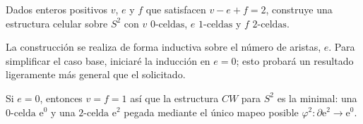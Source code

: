 \setcounter{eje}{13}
\begin{ejer}
Dados enteros positivos $v$, $e$ y $f$ que satisfacen $v - e + f = 2$, construye una estructura celular sobre $S^2$ con $v$ $0\text{-celdas}$, $e$ $1\text{-celdas}$ y $f$ $2\text{-celdas}$.
\end{ejer}
\begin{sol}
La construcción se realiza de forma inductiva sobre el número de aristas, $e$. Para simplificar el caso base, iniciaré la inducción en $e=0$; esto probará un resultado ligeramente más general que el solicitado.\par
Si $e=0$, entonces $v=f=1$ así que la estructura $CW$ para $S^2$ es la minimal: una $0\text{-celda}$ $\mathrm{e}^0$ y una $2\text{-celda}$ $\mathrm{e}^2$ pegada mediante el único mapeo posible $\varphi^2 \colon \partial \mathrm{e}^2 \to \mathrm{e}^0$.


\end{sol}

